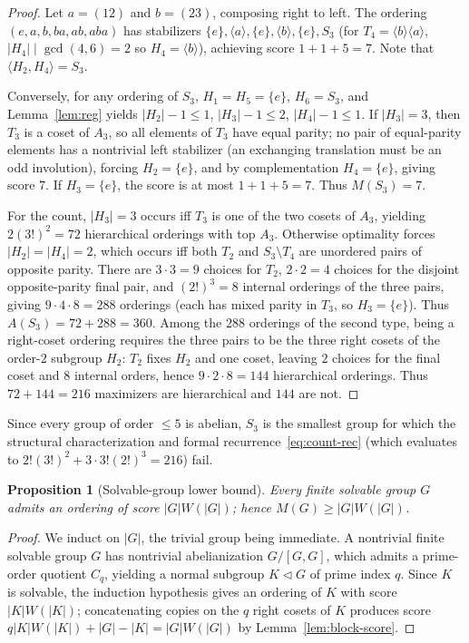 \documentclass[11pt,reqno]{amsart}
\numberwithin{equation}{section}
\newtheorem{proposition}[theorem]{Proposition}
\theoremstyle{definition}
\theoremstyle{remark}
\begin{document}
\begin{proof}
Let $a=(12)$ and $b=(23)$, composing right to left. The ordering $(e,a,b,ba,ab,aba)$ has stabilizers $\{e\},\langle a\rangle,\{e\},\langle b\rangle,\{e\},S_3$ (for $T_4=\langle b\rangle\langle a\rangle$, $|H_4|\mid \gcd(4,6)=2$ so $H_4=\langle b\rangle$), achieving score $1+1+5=7$. Note that $\langle H_2,H_4\rangle = S_3$.

Conversely, for any ordering of $S_3$, $H_1=H_5=\{e\}$, $H_6=S_3$, and Lemma~\ref{lem:reg} yields $|H_2|-1\le 1$, $|H_3|-1\le 2$, $|H_4|-1\le 1$. If $|H_3|=3$, then $T_3$ is a coset of $A_3$, so all elements of $T_3$ have equal parity; no pair of equal-parity elements has a nontrivial left stabilizer (an exchanging translation must be an odd involution), forcing $H_2=\{e\}$, and by complementation $H_4=\{e\}$, giving score $7$. If $H_3=\{e\}$, the score is at most $1+1+5=7$. Thus $M(S_3)=7$.

For the count, $|H_3|=3$ occurs iff $T_3$ is one of the two cosets of $A_3$, yielding $2(3!)^2=72$ hierarchical orderings with top $A_3$. Otherwise optimality forces $|H_2|=|H_4|=2$, which occurs iff both $T_2$ and $S_3\setminus T_4$ are unordered pairs of opposite parity. There are $3\cdot 3=9$ choices for $T_2$, $2\cdot 2=4$ choices for the disjoint opposite-parity final pair, and $(2!)^3=8$ internal orderings of the three pairs, giving $9\cdot 4\cdot 8=288$ orderings (each has mixed parity in $T_3$, so $H_3=\{e\}$). Thus $A(S_3)=72+288=360$. Among the $288$ orderings of the second type, being a right-coset ordering requires the three pairs to be the three right cosets of the order-$2$ subgroup $H_2$: $T_2$ fixes $H_2$ and one coset, leaving $2$ choices for the final coset and $8$ internal orders, hence $9\cdot 2\cdot 8=144$ hierarchical orderings. Thus $72+144=216$ maximizers are hierarchical and $144$ are not.
\end{proof}

Since every group of order $\le 5$ is abelian, $S_3$ is the smallest group for which the structural characterization and formal recurrence~\eqref{eq:count-rec} (which evaluates to $2!(3!)^2+3\cdot 3!(2!)^3=216$) fail.

\begin{proposition}[Solvable-group lower bound]
\label{prop:solvable}
Every finite solvable group $G$ admits an ordering of score $|G|W(|G|)$; hence $M(G)\ge |G|W(|G|)$.
\end{proposition}

\begin{proof}
We induct on $|G|$, the trivial group being immediate. A nontrivial finite solvable group $G$ has nontrivial abelianization $G/[G,G]$, which admits a prime-order quotient $C_q$, yielding a normal subgroup $K\lhd G$ of prime index $q$. Since $K$ is solvable, the induction hypothesis gives an ordering of $K$ with score $|K|W(|K|)$; concatenating copies on the $q$ right cosets of $K$ produces score $q|K|W(|K|)+|G|-|K|=|G|W(|G|)$ by Lemma~\ref{lem:block-score}.
\end{proof}
\end{document}
